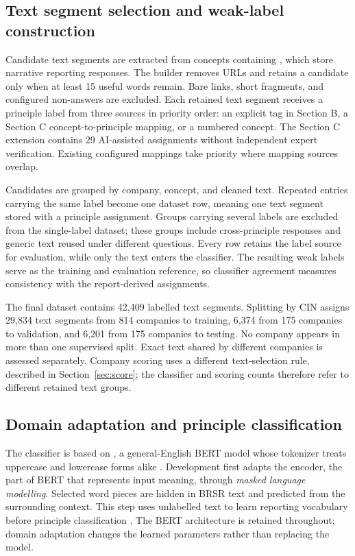 \subsection{Text segment selection and weak-label construction}
\label{sec:labels}

Candidate text segments are extracted from concepts containing , which store narrative reporting responses. The builder removes URLs and retains a candidate only when at least 15 useful words remain. Bare links, short fragments, and configured non-answers are excluded. Each retained text segment receives a principle label from three sources in priority order: an explicit  tag in Section B, a Section C concept-to-principle mapping, or a numbered  concept. The Section C extension contains 29 AI-assisted assignments without independent expert verification. Existing configured mappings take priority where mapping sources overlap.

Candidates are grouped by company, concept, and cleaned text. Repeated entries carrying the same label become one dataset row, meaning one text segment stored with a principle assignment. Groups carrying several labels are excluded from the single-label dataset; these groups include cross-principle responses and generic text reused under different questions. Every row retains the label source for evaluation, while only the text enters the classifier. The resulting weak labels serve as the training and evaluation reference, so classifier agreement measures consistency with the report-derived assignments.

The final dataset contains 42,409 labelled text segments. Splitting by CIN assigns 29,834 text segments from 814 companies to training, 6,374 from 175 companies to validation, and 6,201 from 175 companies to testing. No company appears in more than one supervised split. Exact text shared by different companies is assessed separately. Company scoring uses a different text-selection rule, described in Section~\ref{sec:score}; the classifier and scoring counts therefore refer to different retained text groups.

\subsection{Domain adaptation and principle classification}
\label{sec:classifier}

The classifier is based on , a general-English BERT model whose tokenizer treats uppercase and lowercase forms alike \cite{devlin2019}. Development first adapts the encoder, the part of BERT that represents input meaning, through \emph{masked language modelling}. Selected word pieces are hidden in BRSR text and predicted from the surrounding context. This step uses unlabelled text to learn reporting vocabulary before principle classification \cite{gururangan2020}. The BERT architecture is retained throughout; domain adaptation changes the learned parameters rather than replacing the model.


